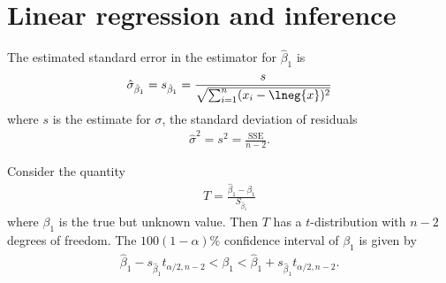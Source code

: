 \documentclass{article}
\begin{document}
\section{Linear regression and inference}


\begin{theorem}
	The estimated standard error in the estimator for $\hat\beta_1$ is
	\begin{align*}
		\hat\sigma_{\hat\beta_1}=s_{\hat\beta_1}=\frac{s}{\sqrt{\sum_{i=1}^n (x_i-\lneg{x})^2}}
	\end{align*}
	where $s$ is the estimate for $\sigma$, the standard deviation of
	residuals
	\begin{align*}
		\hat\sigma^2 = s^2 = \frac{\text{SSE}}{n-2}.
	\end{align*}
\end{theorem}

\begin{theorem}
	Consider the quantity
	\begin{align*}
		T=\frac{\hat\beta_1-\beta_1}{S_{\hat\beta_1}}
	\end{align*}
	where $\beta_1$ is the true but unknown value. Then $T$ 
	has a $t$-distribution with $n-2$ degrees of freedom.
	The $100(1-\alpha)\%$ confidence interval of $\beta_1$ is given by
	\begin{align*}
		\hat\beta_1 - s_{\hat\beta_1}t_{\alpha/2,n-2} <\beta_1
		<\hat\beta_1+s_{\hat\beta_1}t_{\alpha/2,n-2}.
	\end{align*}
\end{theorem}
\end{document}
